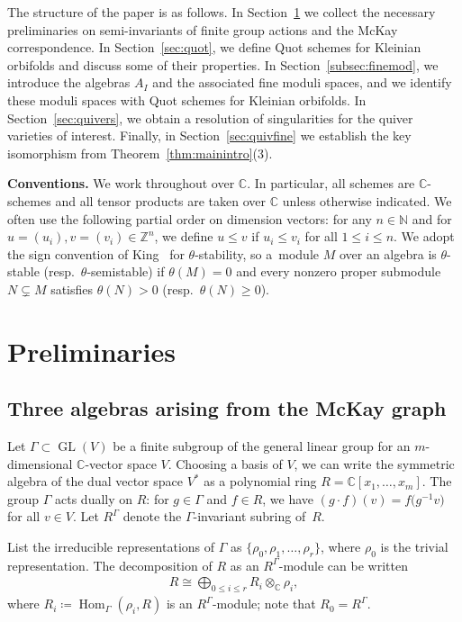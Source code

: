 \documentclass[10pt,a4paper]{amsart}
\newcommand{\SC}{\mathbb{C}} %
\newcommand{\GL}{\operatorname{GL}}
\newcommand{\Hom}{\operatorname{Hom}}
\numberwithin{equation}{section}
\begin{document}
The structure of the paper is as follows. In Section~\ref{sec:prelim} we collect
the necessary preliminaries on semi-invariants of finite group actions and the McKay correspondence. In Section~\ref{sec:quot}, we define Quot schemes for Kleinian orbifolds and discuss some of their properties. In Section~\ref{subsec:finemod}, we introduce the algebras $A_I$
and the associated fine moduli spaces, and we identify these moduli spaces with Quot schemes for Kleinian orbifolds. In Section~\ref{sec:quivers},
we obtain a resolution of singularities for the quiver varieties of interest.
Finally, in Section~\ref{sec:quivfine} we establish the key isomorphism from Theorem~\ref{thm:mainintro}(3).

\medskip

\noindent
\textbf{Conventions.}
 We work throughout over $\SC$. In particular, all schemes are $\SC$-schemes and all tensor products are taken over $\SC$ unless otherwise indicated. We often use the following partial order on dimension vectors: for any $n\in \mathbb{N}$ and for $u=(u_i),v=(v_i)\in \mathbb{Z}^n$, we define $u\le v$ if $u_i\le v_i$ for all $1\leq i\leq n$. We adopt the sign convention of King~\cite{king1994moduli} for $\theta$-stability, so a~module $M$ over an algebra is $\theta$-stable (resp.\ $\theta$-semistable) if $\theta(M)=0$ and every nonzero proper submodule $N\subsetneq M$ satisfies $\theta(N)>0$ (resp.\ $\theta(N)\ge 0$).

\section{Preliminaries}\label{sec:prelim}

\subsection{Three algebras arising from the McKay graph}\label{subsec:mckay}
Let $\Gamma\subset \GL(V)$ be a finite subgroup of the general linear group for an $m$-dimensional $\SC$-vector space $V$.
Choosing a basis of $V$, we can write the symmetric algebra of the dual vector space $V^*$ as a polynomial ring $R=\SC[x_1,\dots,x_m]$. The group $\Gamma$ acts dually on $R$: for $g\in \Gamma$ and $f\in R$, we have $(g\cdot f)(v) = f\big(g^{-1} v\big)$ for all $v\in V$. Let $R^\Gamma$ denote the $\Gamma$-invariant subring of~$R$.

List the irreducible representations of $\Gamma$ as $\{\rho_0, \rho_1, \dots, \rho_r\}$, where $\rho_0$ is the trivial representation.
The decomposition of $R$ as an $R^\Gamma$-module can be written \cite[Proposition~4.1.15]{goodman2009symmetry}
 \begin{gather*} %
 R\cong \bigoplus_{0\leq i\leq r} R_i\otimes_\mathbb{C} \rho_i,
 \end{gather*}
 where $R_i\coloneqq \Hom_\Gamma(\rho_i,R)$ is an
 $R^\Gamma$-module; note that $R_0=R^{\Gamma}$.
\end{document}

